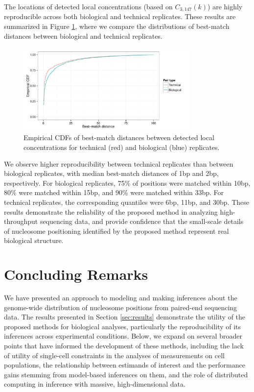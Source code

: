The locations of detected local concentrations (based on $C_{3,147}(k)$) are highly reproducible across both biological and technical replicates.
These results are summarized in Figure \ref{fig:localConcentrationReproducibility}, where we compare the distributions of best-match distances between biological and technical replicates.
%
\ifx\nofigures\undefined
\begin{figure}
 \centering
 \includegraphics[width=0.8\textwidth]{figures/nucleosomes/plot_reproducibility_cdfs_pm3}
 \caption{Empirical CDFs of best-match distances between detected local concentrations for technical (red) and biological (blue) replicates. \label{fig:localConcentrationReproducibility}}
\end{figure}
\fi

We observe higher reproducibility between technical replicates than between biological replicates, with median best-match distances of 1bp and 2bp, respectively.
For biological replicates, 75\% of positions were matched within 10bp, 80\% were matched within 15bp, and 90\% were matched within 33bp.
For technical replicates, the corresponding quantiles were 6bp, 11bp, and 30bp.
These results demonstrate the reliability of the proposed method in analyzing high-throughput sequencing data, and provide confidence that the small-scale details of nucleosome positioning identified by the proposed method represent real biological structure.


\section{Concluding Remarks}
\label{sec:remarks}

We have presented an approach to modeling and making inferences about the genome-wide distribution of nucleosome positions from paired-end sequencing data.
The results presented in Section \ref{sec:results} demonstrate the utility of the proposed methods for biological analyses, particularly the reproducibility of its inferences across experimental conditions.
Below, we expand on several broader points that have informed the development of these methods, including
 the lack of utility of single-cell constraints in the analyses of measurements on cell populations, 
 the relationship between estimands of interest and the performance gains stemming from model-based inferences on them,
 and the role of distributed computing in inference with massive, high-dimensional data.

